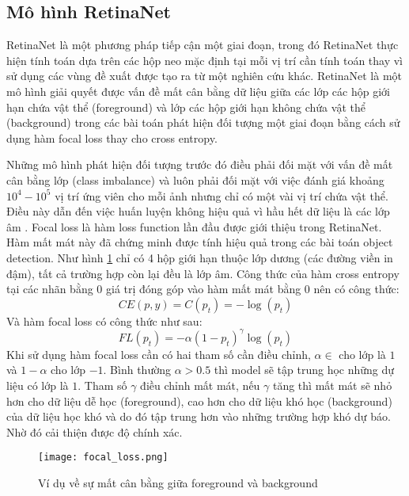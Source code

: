 \documentclass[../the.tex]{subfiles}
\begin{document}
\subsection{Mô hình RetinaNet} 
{\fontsize{13}{12} \selectfont  
RetinaNet là một phương pháp tiếp cận một giai đoạn, trong đó RetinaNet thực hiện tính toán dựa trên các hộp neo mặc định tại mỗi vị trí cần tính toán thay vì sử dụng các vùng đề xuất được tạo ra từ một nghiên cứu khác. RetinaNet là một mô hình giải quyết được vấn đề mất cân bằng dữ liệu giữa các lớp các hộp giới hạn chứa vật thể (foreground) và lớp các hộp giới hạn không chứa vật thể (background) trong các bài toán phát hiện đối tượng một giai đoạn 
bằng cách sử dụng hàm focal loss thay cho cross entropy. 


Những mô hình phát hiện đối tượng trước đó điều phải đối mặt với vấn đề mất cân bằng lớp (class imbalance) và luôn phải đối mặt với việc đánh giá khoảng $10^4 - 10^5$ vị trí ứng viên cho mỗi ảnh nhưng chỉ có một vài vị trí chứa vật thể.
Điều này dẫn đến việc huấn luyện không hiệu quả vì hầu hết dữ liệu là các lớp âm \cite{lin2018focal}. Focal loss là hàm loss function lần đầu được giới thiệu trong RetinaNet. Hàm mất mát này đã chứng minh được tính hiệu quả trong các bài toán object detection.
Như hình \ref{fig:focal_loss} chỉ có 4 hộp giới hạn thuộc lớp dương (các đường viền in đậm), tất cả trường hợp còn lại đều là lớp âm. Công thức của hàm cross entropy tại các nhãn bằng 0 giá trị đóng góp vào hàm mất mát bằng 0 nên có công thức:
\begin{equation}
	CE(p,y) = C(p_t) =  -\log(p_t)
\end{equation}
Và hàm focal loss có công thức như sau:
\begin{equation}
		FL(p_t) = -\alpha(1-p_t)^\gamma \log(p_t)
\end{equation}
Khi sử dụng hàm focal loss cần có hai tham số cần điều chỉnh, $\alpha \in$ cho lớp là $1$ và $1 - \alpha$ cho lớp $-1$. 
Bình thường $\alpha > 0.5$ thì model sẽ tập trung học những dự liệu có lớp là $1$. Tham số $\gamma$ điều chỉnh mất mát,
nếu $\gamma$ tăng thì mất mát sẽ nhỏ hơn cho dữ liệu dễ học (foreground), cao hơn cho dữ liệu khó học (background) của dữ liệu học khó 
và do đó tập trung hơn vào những trường hợp khó dự báo. Nhờ đó cải thiện được độ chính xác.
}
\begin{figure}[H]
	\centering
	\texttt{[image: focal\_loss.png]}
	\caption{Ví dụ về sự mất cân bằng giữa  foreground và background\cite{lin2018focal}}
	\label{fig:focal_loss}
\end{figure}
\end{document}
